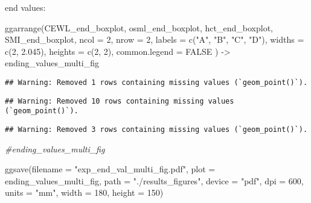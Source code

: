 \documentclass[
]{article}
\newenvironment{Shaded}{\begin{snugshade}}{\end{snugshade}}
\newcommand{\AttributeTok}[1]{\textcolor[rgb]{0.77,0.63,0.00}{#1}}
\newcommand{\CommentTok}[1]{\textcolor[rgb]{0.56,0.35,0.01}{\textit{#1}}}
\newcommand{\ConstantTok}[1]{\textcolor[rgb]{0.00,0.00,0.00}{#1}}
\newcommand{\DecValTok}[1]{\textcolor[rgb]{0.00,0.00,0.81}{#1}}
\newcommand{\FloatTok}[1]{\textcolor[rgb]{0.00,0.00,0.81}{#1}}
\newcommand{\FunctionTok}[1]{\textcolor[rgb]{0.00,0.00,0.00}{#1}}
\newcommand{\NormalTok}[1]{#1}
\newcommand{\OtherTok}[1]{\textcolor[rgb]{0.56,0.35,0.01}{#1}}
\newcommand{\StringTok}[1]{\textcolor[rgb]{0.31,0.60,0.02}{#1}}
\begin{document}
end values:

\begin{Shaded}
\begin{Highlighting}[]
\FunctionTok{ggarrange}\NormalTok{(CEWL\_end\_boxplot, }
\NormalTok{          osml\_end\_boxplot, }
\NormalTok{          hct\_end\_boxplot,}
\NormalTok{          SMI\_end\_boxplot, }
          \AttributeTok{ncol =} \DecValTok{2}\NormalTok{, }\AttributeTok{nrow =} \DecValTok{2}\NormalTok{,}
          \AttributeTok{labels =} \FunctionTok{c}\NormalTok{(}\StringTok{"A"}\NormalTok{, }\StringTok{"B"}\NormalTok{, }\StringTok{"C"}\NormalTok{, }\StringTok{"D"}\NormalTok{),}
          \AttributeTok{widths =} \FunctionTok{c}\NormalTok{(}\DecValTok{2}\NormalTok{, }\FloatTok{2.045}\NormalTok{), }\AttributeTok{heights =} \FunctionTok{c}\NormalTok{(}\DecValTok{2}\NormalTok{, }\DecValTok{2}\NormalTok{),}
          \AttributeTok{common.legend =} \ConstantTok{FALSE}
\NormalTok{          ) }\OtherTok{{-}\textgreater{}}\NormalTok{ ending\_values\_multi\_fig}
\end{Highlighting}
\end{Shaded}

\begin{verbatim}
## Warning: Removed 1 rows containing missing values (`geom_point()`).
\end{verbatim}

\begin{verbatim}
## Warning: Removed 10 rows containing missing values (`geom_point()`).
\end{verbatim}

\begin{verbatim}
## Warning: Removed 3 rows containing missing values (`geom_point()`).
\end{verbatim}

\begin{Shaded}
\begin{Highlighting}[]
\CommentTok{\#ending\_values\_multi\_fig}

\FunctionTok{ggsave}\NormalTok{(}\AttributeTok{filename =} \StringTok{"exp\_end\_val\_multi\_fig.pdf"}\NormalTok{,}
       \AttributeTok{plot =}\NormalTok{ ending\_values\_multi\_fig,}
       \AttributeTok{path =} \StringTok{"./results\_figures"}\NormalTok{,}
       \AttributeTok{device =} \StringTok{"pdf"}\NormalTok{,}
       \AttributeTok{dpi =} \DecValTok{600}\NormalTok{,}
       \AttributeTok{units =} \StringTok{"mm"}\NormalTok{,}
       \AttributeTok{width =} \DecValTok{180}\NormalTok{, }\AttributeTok{height =} \DecValTok{150}\NormalTok{)}
\end{Highlighting}
\end{Shaded}
\end{document}
